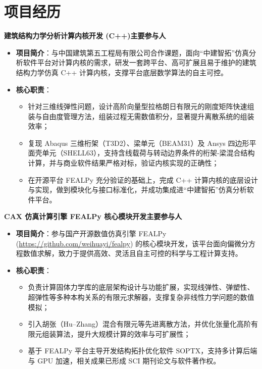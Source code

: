 \documentclass[11pt]{article}
\newlength{\iconwidth}
\begin{document}
	\begin{minipage}[t]{\textwidth}
		\section[项目经历]{\makebox[\iconwidth][c]{\color{primary_color}{\faChalkboardTeacher}}\quad 项目经历}
		
		\vspace{0.5em}
		
		{\large \textbf{建筑结构力学分析计算内核开发 (C++)}}\quad \textbf{主要参与人}
		\begin{itemize}
			\setlength{\itemsep}{0.2em}
			\item \textbf{项目简介}：与中国建筑第五工程局有限公司合作课题，面向“中建智拓”仿真分析软件平台对计算内核的需求，研发一套跨平台、高可扩展且易于维护的建筑结构力学仿真 C++ 计算内核，支撑平台底层数学算法的自主可控。
			\item \textbf{核心职责}：
			\begin{itemize}
				\setlength{\itemsep}{0.2em}
				\item 针对三维线弹性问题，设计高阶向量型拉格朗日有限元的刚度矩阵快速组装与自由度管理方法，组装过程无需数值积分，显著提升离散系统的组装效率；
				\item 复现 Abaqus 三维桁架（T3D2）、梁单元（BEAM31）及 Ansys 四边形平面壳单元（SHELL63），支持含线载荷与转动边界条件的桁架-梁混合结构计算，并与商业软件结果严格对标，验证内核实现的正确性；
				\item 在开源平台 FEALPy 充分验证的基础上，完成 C++ 计算内核的底层设计与实现，做到模块化与接口标准化，并成功集成进“中建智拓”仿真分析软件平台。
			\end{itemize}
		\end{itemize}

		\vspace{0.6em}
		
		{\large \textbf{CAX 仿真计算引擎 FEALPy 核心模块开发}}\quad \textbf{主要参与人}
		\begin{itemize}
			\setlength{\itemsep}{0.2em}
			\item \textbf{项目简介}：参与国产开源数值仿真引擎 FEALPy (\href{https://github.com/weihuayi/fealpy}{https://github.com/weihuayi/fealpy}) 的核心模块开发，该平台面向偏微分方程数值求解，致力于提供高效、灵活且自主可控的科学与工程计算支持。
			\item \textbf{核心职责}：
			\begin{itemize}
				\setlength{\itemsep}{0.2em}
				\item 负责计算固体力学库的底层架构设计与功能扩展，实现线弹性、弹塑性、超弹性等多种本构关系的有限元求解器，支撑复杂非线性力学问题的数值模拟；
				\item 引入胡张（Hu--Zhang）混合有限元等先进离散方法，并优化张量化高阶有限元组装算法，提升大规模计算的效率与可扩展性；
				\item 基于 FEALPy 平台主导开发结构拓扑优化软件 SOPTX，支持多计算后端与 GPU 加速，相关成果已形成 SCI 期刊论文与软件著作权。
			\end{itemize}
		\end{itemize}
		

\end{minipage}
\end{document}
